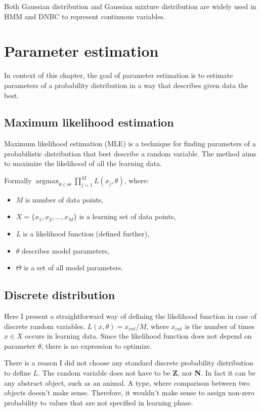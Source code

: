 \documentclass[thesis=B,english]{FITthesis}[2012/06/26]
\DeclareMathOperator*{\argmax}{argmax} %
\begin{document}
Both Gaussian distribution and Gaussian mixture distribution are widely used in HMM and DNBC to represent continuous variables.

\chapter{Parameter estimation}
\label{parameter-estimation-chapter}
In context of this chapter, the goal of parameter estimation is to estimate parameters of a probability distribution in a way that describes given data the best.

\section{Maximum likelihood estimation}
Maximum likelihood estimation (MLE) is a technique for finding parameters of a probabilistic distribution that best describe a random variable. The method aims to maximize the likelihood of all the learning data.

Formally $\argmax_{\theta \in \Theta} \prod_{j=1}^{M} L(x_j, \theta)$, where:

\begin{itemize}

\item $M$ is number of data points,
\item $X = \{x_1, x_2, \dots, x_M\}$ is a learning set of data points,
\item \emph{L} is a likelihood function (defined further),
\item $\theta$ describes model parameters,
\item $\Theta$ is a set of all model parameters.

\end{itemize}

\section{Discrete distribution}

Here I present a straightforward way of defining the likelihood function in case of discrete random variables. $L(x,\theta) = x_{cnt} / M$, where $x_{cnt}$ is the number of times $x \in X$ occurs in learning data. Since the likelihood function does not depend on parameter $\theta$, there is no expression to optimize.

There is a reason I did not choose any standard discrete probability distribution to define $L$. The random variable does not have to be \textbf Z, nor \textbf N. In fact it can be any abstract object, such as an animal. A type, where comparison between two objects doesn't make sense. Therefore, it wouldn't make sense to assign non-zero probability to values that are not specified in learning phase.
\end{document}
